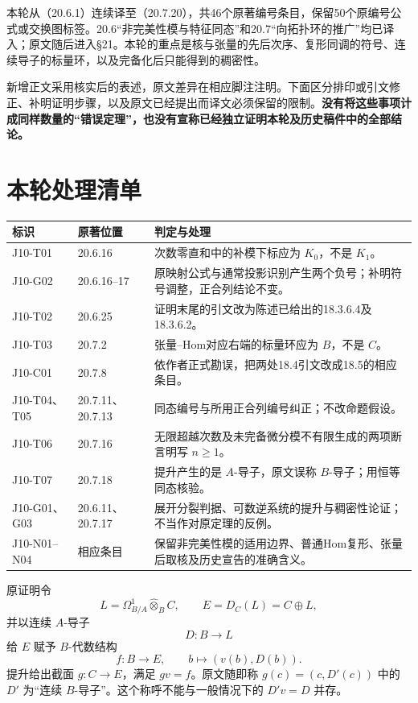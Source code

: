 
本轮从（20.6.1）连续译至（20.7.20），共46个原著编号条目，保留50个原编号公式或交换图标签。20.6“非完美性模与特征同态”和20.7“向拓扑环的推广”均已译入；原文随后进入§21。本轮的重点是核与张量的先后次序、复形同调的符号、连续导子的标量环，以及完备化后只能得到的稠密性。

新增正文采用核实后的表述，原文差异在相应脚注注明。下面区分排印或引文修正、补明证明步骤，以及原文已经提出而译文必须保留的限制。\textbf{没有将这些事项计成同样数量的“错误定理”，也没有宣称已经独立证明本轮及历史稿件中的全部结论。}

\section*{本轮处理清单}
\begin{longtable}{@{}p{.18\linewidth}p{.19\linewidth}p{.54\linewidth}@{}}
\toprule 标识 & 原著位置 & 判定与处理\\\midrule\endhead
J10-T01 & 20.6.16 & 次数零直和中的补模下标应为 $K_0$，不是 $K_1$。\\
J10-G02 & 20.6.16--17 & 原映射公式与通常投影识别产生两个负号；补明符号调整，正合列结论不变。\\
J10-T02 & 20.6.25 & 证明末尾的引文改为陈述已给出的18.3.6.4及18.3.6.2。\\
J10-T03 & 20.7.2 & 张量--Hom对应右端的标量环应为 $B$，不是 $C$。\\
J10-C01 & 20.7.8 & 依作者正式勘误，把两处18.4引文改成18.5的相应条目。\\
J10-T04、T05 & 20.7.11、20.7.13 & 同态编号与所用正合列编号纠正；不改命题假设。\\
J10-T06 & 20.7.16 & 无限超越次数及未完备微分模不有限生成的两项断言明写 $n\ge1$。\\
J10-T07 & 20.7.18 & 提升产生的是 $A$-导子，原文误称 $B$-导子；用恒等同态核验。\\
J10-G01、G03 & 20.6.11、20.7.17 & 展开分裂判据、可数逆系统的提升与稠密性论证；不当作对原定理的反例。\\
J10-N01--N04 & 相应条目 & 保留非完美性模的适用边界、普通Hom复形、张量后取核及历史宣告的准确含义。\\
\bottomrule
\end{longtable}

原证明令
\[
 L=\Omega^1_{B/A}\widehat\otimes_B C,\qquad E=D_C(L)=C\oplus L,
\]
并以连续 $A$-导子
\[
 D:B\longrightarrow L
\]
给 $E$ 赋予 $B$-代数结构
\[
 f:B\to E,\qquad b\mapsto(v(b),D(b)).
\]
提升给出截面 $g:C\to E$，满足 $gv=f$。原文随即称
$g(c)=(c,D'(c))$ 中的 $D'$ 为“连续 $B$-导子”。这个称呼不能与一般情况下的 $D'v=D$ 并存。


